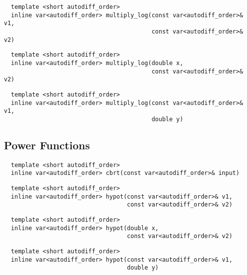 \begin{tcolorbox}[colback=white,colframe=gray90, coltitle=black,boxrule=3pt,
fonttitle=\bfseries,title=Input Natural Logarithm Product]

\begin{verbatim}
  template <short autodiff_order>
  inline var<autodiff_order> multiply_log(const var<autodiff_order>& v1,
                                          const var<autodiff_order>& v2)
\end{verbatim}

\begin{verbatim}
  template <short autodiff_order>
  inline var<autodiff_order> multiply_log(double x,
                                          const var<autodiff_order>& v2)
\end{verbatim}

\begin{verbatim}
  template <short autodiff_order>
  inline var<autodiff_order> multiply_log(const var<autodiff_order>& v1,
                                          double y)
\end{verbatim}

\end{tcolorbox}

\subsection{Power Functions}

\begin{tcolorbox}[colback=white,colframe=gray90, coltitle=black,boxrule=3pt,
fonttitle=\bfseries,title=Cubic Root]

\begin{verbatim}
  template <short autodiff_order>
  inline var<autodiff_order> cbrt(const var<autodiff_order>& input)
\end{verbatim}

\end{tcolorbox}

\begin{tcolorbox}[colback=white,colframe=gray90, coltitle=black,boxrule=3pt,
fonttitle=\bfseries,title=Hypotenuse]

\begin{verbatim}
  template <short autodiff_order>
  inline var<autodiff_order> hypot(const var<autodiff_order>& v1,
                                   const var<autodiff_order>& v2)
\end{verbatim}

\begin{verbatim}
  template <short autodiff_order>
  inline var<autodiff_order> hypot(double x,
                                   const var<autodiff_order>& v2)
\end{verbatim}

\begin{verbatim}
  template <short autodiff_order>
  inline var<autodiff_order> hypot(const var<autodiff_order>& v1,
                                   double y)
\end{verbatim}

\end{tcolorbox}

